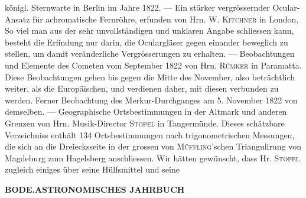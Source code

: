 königl. Sternwarte in Berlin im Jahre 1822. --- Ein stärker vergrössernder Ocular-Ansatz für achromatische Fernröhre, erfunden von Hrn. W. \textsc{Kitchner} in London, So viel man aus der sehr unvollständigen und unklaren Angabe schliessen kann, besteht die Erfindung nur darin, die Oculargläser gegen einander beweglich zu stellen, um damit veränderliche Vergrösserungen zu erhalten. --- Beobachtungen und Elemente des Cometen vom September 1822 von Hrn. \textsc{Rümker} in Paramatta. Diese Beobachtungen gehen bis gegen die Mitte des November, also beträchtlich weiter, als die Europäischen, und verdienen daher, mit diesen verbunden zu werden. Ferner Beobachtung des Merkur-Durchganges am 5. November 1822 von demselben. --- Geographische Ortsbestimmungen in der Altmark und anderen Grenzen von Hrn. Musik-Director \textsc{Stöpel} in Tangermünde. Dieses schätzbare Verzeichniss enthält 134 Ortsbestimmungen nach trigonometrischen Messungen, die sich an die Dreiecksseite in der grossen von \textsc{Müffling}'schen Triangulirung von Magdeburg zum Hagelsberg anschliessen. Wir hätten gewünscht, dass Hr. \textsc{Stöpel} zugleich einiges über seine Hülfsmittel und seine\par
\clearpage
\thispagestyle{empty}
\noindent{}%
\makebox[12mm][l]{}%
\parbox[t]{\dimexpr\linewidth-24mm\relax}{\centering\footnotesize\bfseries BODE.\enspace ASTRONOMISCHES JAHRBUCH\par}%
\par\medskip
